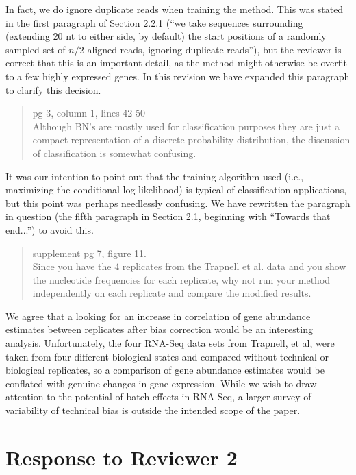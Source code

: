 \documentclass{article}
\begin{document}
In fact, we do ignore duplicate reads when training the method. This was stated
in the first paragraph of Section 2.2.1 (``we take sequences surrounding
(extending 20 nt to either side, by default) the start positions of a randomly
sampled set of $n/2$ aligned reads, ignoring duplicate reads''), but the reviewer is
correct that this is an important detail, as the method might otherwise be
overfit to a few highly expressed genes. In this revision we have expanded
this paragraph to clarify this decision.


\begin{quote}
pg 3, column 1, lines 42-50 \\
Although BN's are mostly used for classification purposes they are just a
compact representation of a discrete probability distribution, the discussion
of classification is somewhat confusing.
\end{quote}

It was our intention to point out that the training algorithm used (i.e.,
maximizing the conditional log-likelihood) is typical of classification
applications, but this point was perhaps needlessly confusing. We have
rewritten the paragraph in question (the fifth paragraph in Section 2.1,
beginning with ``Towards that end...'') to avoid this.


\begin{quote}
supplement pg 7, figure 11. \\
Since you have the 4 replicates from the Trapnell et al. data and you show the
nucleotide frequencies for each replicate, why not run your method independently
on each replicate and compare the modified results.
\end{quote}

We agree that a looking for an increase in correlation of gene abundance
estimates between replicates after bias correction would be an interesting
analysis. Unfortunately, the four RNA-Seq data sets from Trapnell, et al, were
taken from four different biological states and compared without technical or
biological replicates, so a comparison of gene abundance estimates would be
conflated with genuine changes in gene expression.  While we wish to draw
attention to the potential of batch effects in RNA-Seq, a larger survey of
variability of technical bias is outside the intended scope of the paper.


\section*{Response to Reviewer 2}
\end{document}
